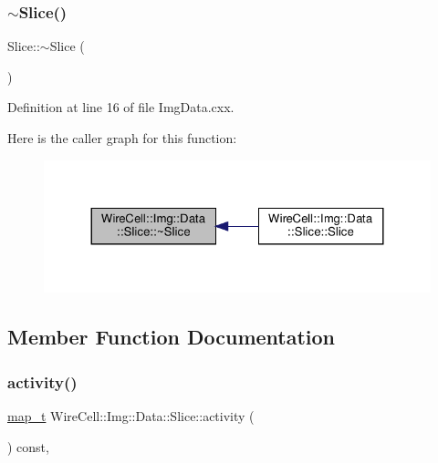 \subsubsection{\texorpdfstring{$\sim$\+Slice()}{~Slice()}}
{\footnotesize\ttfamily Slice\+::$\sim$\+Slice (\begin{DoxyParamCaption}{ }\end{DoxyParamCaption})\hspace{0.3cm}{\ttfamily [virtual]}}



Definition at line 16 of file Img\+Data.\+cxx.

Here is the caller graph for this function\+:
\nopagebreak
\begin{figure}[H]
\begin{center}
\leavevmode
\includegraphics[width=324pt]{class_wire_cell_1_1_img_1_1_data_1_1_slice_af5eca11ee40a61159787ec35f2f1ed27_icgraph}
\end{center}
\end{figure}


\subsection{Member Function Documentation}
\mbox{\label{class_wire_cell_1_1_img_1_1_data_1_1_slice_a7f321316b726582a7d476ecebbdc2dc5}} 
\subsubsection{\texorpdfstring{activity()}{activity()}}
{\footnotesize\ttfamily \hyperlink{class_wire_cell_1_1_i_slice_ac953094751a404827468ca9887736415}{map\+\_\+t} Wire\+Cell\+::\+Img\+::\+Data\+::\+Slice\+::activity (\begin{DoxyParamCaption}{ }\end{DoxyParamCaption}) const\hspace{0.3cm}{\ttfamily [inline]}, {\ttfamily [virtual]}}




